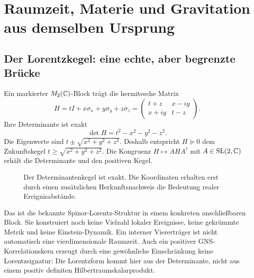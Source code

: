 \chapter{Raumzeit, Materie und Gravitation aus demselben Ursprung}
\label{ch:physik}
\section{Der Lorentzkegel: eine echte, aber begrenzte Brücke}
Ein markierter $M_2(\mathbb C)$-Block trägt die hermitesche Matrix
\begin{equation}
H=tI+x\sigma_x+y\sigma_y+z\sigma_z
=\begin{pmatrix}t+z&x-iy\\x+iy&t-z\end{pmatrix}.
\end{equation}
Ihre Determinante ist exakt
\begin{equation}
\det H=t^2-x^2-y^2-z^2.
\end{equation}
Die Eigenwerte sind $t\pm\sqrt{x^2+y^2+z^2}$. Deshalb entspricht $H\succeq0$ dem Zukunftskegel $t\ge\sqrt{x^2+y^2+z^2}$. Die Kongruenz $H\mapsto AHA^\dagger$ mit $A\in\mathrm{SL}(2,\mathbb C)$ erhält die Determinante und den positiven Kegel.

\begin{figure}[H]\centering
{}
\caption{Der Determinantenkegel ist exakt. Die Koordinaten erhalten erst durch einen zusätzlichen Herkunftsnachweis die Bedeutung realer Ereignisabstände.}
\end{figure}

Das ist die bekannte Spinor-Lorentz-Struktur in einem konkreten anschließbaren Block. Sie konstruiert noch keine Vielzahl lokaler Ereignisse, keine gekrümmte Metrik und keine Einstein-Dynamik. Ein interner Viererträger ist nicht automatisch eine vierdimensionale Raumzeit. Auch ein positiver GNS-Korrelationskern erzeugt durch eine gewöhnliche Einschränkung keine Lorentzsignatur: Die Lorentzform kommt hier aus der Determinante, nicht aus einem positiv definiten Hilbertraumskalarprodukt. 

